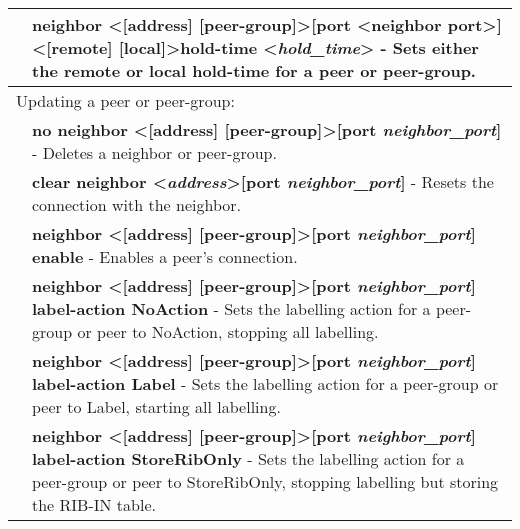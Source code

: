 \begin{tabular}{|p{10pt}p{400pt}|}
& {\bf \small neighbor \textless[address] [peer-group]\textgreater [port \textless neighbor port\textgreater] \textless[remote] [local]\textgreater hold-time \textless\emph{hold\_time}\textgreater} - Sets either the remote or local hold-time for a peer or peer-group. \\[4pt]



\hline

\multicolumn{2}{|l|}{Updating a peer or peer-group:}\\ 

\hline

& {\bf \small no neighbor \textless[address] [peer-group]\textgreater [port \emph{neighbor\_port}]} - Deletes a neighbor or peer-group. \\[4pt]

& {\bf \small clear neighbor \textless\emph{address}\textgreater [port \emph{neighbor\_port}]} - Resets the connection with the neighbor. \\[4pt]

& {\bf \small neighbor \textless[address] [peer-group]\textgreater [port \emph{neighbor\_port}] enable} - Enables a peer's connection. \\[4pt]

& {\bf \small neighbor \textless[address] [peer-group]\textgreater [port \emph{neighbor\_port}] label-action NoAction} - Sets the labelling action for a peer-group or peer to NoAction, stopping all labelling. \\[4pt]

& {\bf \small neighbor \textless[address] [peer-group]\textgreater [port \emph{neighbor\_port}] label-action Label} - Sets the labelling action for a peer-group or peer to Label, starting all labelling. \\[4pt]

& {\bf \small neighbor \textless[address] [peer-group]\textgreater [port \emph{neighbor\_port}] label-action StoreRibOnly} - Sets the labelling action for a peer-group or peer to StoreRibOnly, stopping labelling but storing the RIB-IN table. \\[4pt]


\end{tabular}
